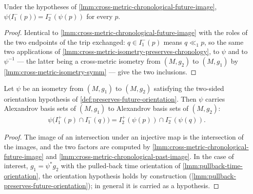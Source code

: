 \begin{lemma}
    \label{lmm:cross-metric-chronological-past-image}
    \leanok
    Under the hypotheses of \ref{lmm:cross-metric-chronological-future-image}, $\psi\big(I^-_1(p)\big) = I^-_2(\psi(p))$ for every $p$.
\end{lemma}
\begin{proof}
    \leanok
    Identical to \ref{lmm:cross-metric-chronological-future-image} with the roles of the two endpoints of the trip exchanged: $q \in I^-_1(p)$ means $q \ll_1 p$, so the same two applications of \ref{lmm:cross-metric-isometry-preserves-chronology}, to $\psi$ and to $\psi^{-1}$ --- the latter being a cross-metric isometry from $(M,g_2)$ to $(M,g_1)$ by \ref{lmm:cross-metric-isometry-symm} --- give the two inclusions.
\end{proof}

\medskip

\begin{lemma}
    \label{lmm:cross-metric-isometry-preserves-basis-sets}
    \leanok
    Let $\psi$ be an isometry from $(M,g_1)$ to $(M,g_2)$ satisfying the two-sided orientation hypothesis of \ref{def:preserves-future-orientation}. Then $\psi$ carries Alexandrov basis sets of $(M,g_1)$ to Alexandrov basis sets of $(M,g_2)$:
    \begin{align}
        \psi\big(I^+_1(p) \cap I^-_1(q)\big) = I^+_2(\psi(p)) \cap I^-_2(\psi(q)).
    \end{align}
\end{lemma}
\begin{proof}
    \leanok
    The image of an intersection under an injective map is the intersection of the images, and the two factors are computed by \ref{lmm:cross-metric-chronological-future-image} and \ref{lmm:cross-metric-chronological-past-image}. In the case of interest, $g_1 = \psi^*g_2$ with the pulled-back time orientation of \ref{lmm:pullback-time-orientation}, the orientation hypothesis holds by construction (\ref{lmm:pullback-preserves-future-orientation}); in general it is carried as a hypothesis.
\end{proof}

